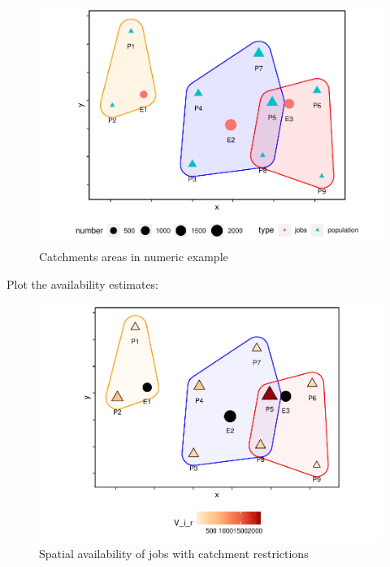 \documentclass[]{elsarticle} %
\begin{document}
\begin{figure}
\includegraphics[width=1\linewidth]{Spatial-Availability_files/figure-latex/toy-example-plot-catchments-1} \caption{\label{fig:toy-example-catchments}Catchments areas in numeric example}\label{fig:toy-example-plot-catchments}
\end{figure}

Plot the availability estimates:

\begin{figure}
\includegraphics[width=1\linewidth]{Spatial-Availability_files/figure-latex/toy-example-availability-with-catchments-1} \caption{\label{fig:toy-example-availability-with-catchments}Spatial availability of jobs with catchment restrictions}\label{fig:toy-example-availability-with-catchments}
\end{figure}
\end{document}
